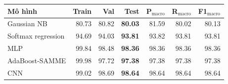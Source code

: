 \begin{tabular}{lrrrrrr}
\toprule
Mô hình & Train & Val & Test & P$_{\text{macro}}$ & R$_{\text{macro}}$ & F1$_{\text{macro}}$ \\
\midrule
Gaussian NB & 80.73 & 80.82 & \textbf{80.03} & 81.59 & 80.02 & 80.13 \\
Softmax regression & 94.69 & 94.03 & \textbf{93.81} & 93.82 & 93.81 & 93.81 \\
MLP & 99.84 & 98.48 & \textbf{98.36} & 98.36 & 98.36 & 98.36 \\
AdaBoost-SAMME & 99.98 & 97.72 & \textbf{97.38} & 97.38 & 97.38 & 97.38 \\
CNN & 99.02 & 98.69 & \textbf{98.64} & 98.64 & 98.64 & 98.64 \\
\bottomrule
\end{tabular}
